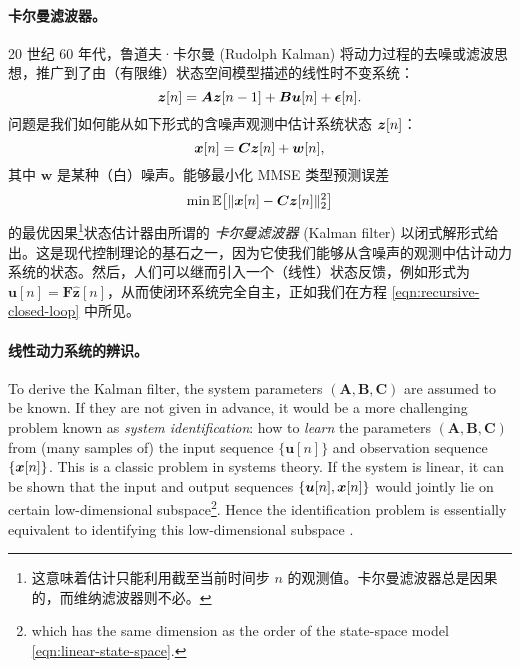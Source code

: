 \documentclass[../../book-main_zh.tex]{subfiles}
\begin{document}
\paragraph{卡尔曼滤波器。} 
20 世纪 60 年代，鲁道夫·卡尔曼 (Rudolph Kalman) 将动力过程的去噪或滤波思想，推广到了由（有限维）状态空间模型描述的线性时不变系统：
\begin{equation}
    \bm{z}[n] = \boldsymbol{A} \bm{z}[n-1] + \boldsymbol{B}\boldsymbol{u}[n] + \boldsymbol{\epsilon}[n]. 
    \label{eqn:linear-state-space}
\end{equation}
问题是我们如何能从如下形式的含噪声观测中估计系统状态 $\bm{z}[n]$： \begin{equation}\bm{x}[n] = \boldsymbol{C} \bm{z}[n] + \boldsymbol{w}[n],
\label{eqn:Kalman-model}
\end{equation}
其中 $\boldsymbol{w}$ 是某种（白）噪声。能够最小化 MMSE 类型预测误差
\begin{equation}
    \min \mathbb{E}\big[ \|\bm{x}[n] - \boldsymbol{C}\bm{z}[n]\|_2^2\big]
\end{equation}
的最优因果\footnote{这意味着估计只能利用截至当前时间步 $n$ 的观测值。卡尔曼滤波器总是因果的，而维纳滤波器则不必。}状态估计器由所谓的 {\em 卡尔曼滤波器} (Kalman filter) \cite{kalman1960new} 以闭式解形式给出。这是现代控制理论的基石之一，因为它使我们能够从含噪声的观测中估计动力系统的状态。然后，人们可以继而引入一个（线性）状态反馈，例如形式为 $\boldsymbol{u}[n] = \boldsymbol{F} \hat{\boldsymbol{z}}[n]$，从而使闭环系统完全自主，正如我们在方程 \eqref{eqn:recursive-closed-loop} 中所见。

\paragraph{线性动力系统的辨识。}

To derive the Kalman filter, the system parameters $(\boldsymbol{A}, \boldsymbol{B}, \boldsymbol{C})$ are assumed to be known. If they are not given in advance, it would be a more challenging problem known as {\em system identification}: how to {\em learn} the parameters $(\boldsymbol{A}, \boldsymbol{B}, \boldsymbol{C})$ from (many samples of) the input sequence $\{\boldsymbol{u}[n]\}$ and observation sequence $\{\bm{x}[n]\}$. This is a classic problem in systems theory. If the system is linear, it can be shown that the input and output sequences $\{\boldsymbol{u}[n], \bm{x}[n]\}$ would jointly lie on certain low-dimensional subspace\footnote{which has the same dimension as the order of the state-space model \eqref{eqn:linear-state-space}. }. Hence the identification problem is essentially equivalent to identifying this low-dimensional subspace \cite{OverscheeP1996,Liu-2009-CDC,Liu-2010-SIAM}. 
\end{document}
